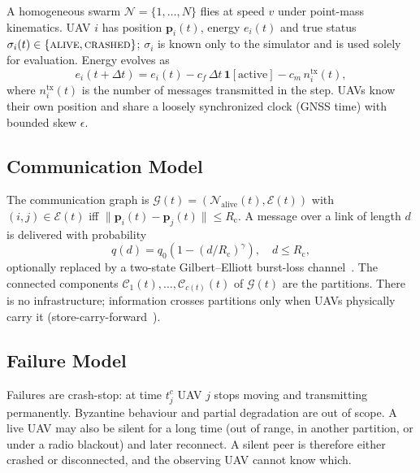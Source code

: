 \documentclass[journal]{IEEEtran}
\newcommand{\Rc}{R_{\mathrm{c}}}
\newcommand{\ind}{\mathbf{1}}
\begin{document}
A homogeneous swarm $\mathcal{N}=\{1,\dots,N\}$ flies at speed $v$ under point-mass kinematics. UAV $i$ has position $\mathbf{p}_i(t)$, energy $e_i(t)$ and true status $\sigma_i(t)\in\{\textsc{alive},\textsc{crashed}\}$; $\sigma_i$ is known only to the simulator and is used solely for evaluation. Energy evolves as
\begin{equation}
e_i(t+\Delta t)=e_i(t)-c_f\,\Delta t\,\ind[\text{active}]-c_m\,n_i^{\mathrm{tx}}(t),
\end{equation}
where $n_i^{\mathrm{tx}}(t)$ is the number of messages transmitted in the step. UAVs know their own position and share a loosely synchronized clock (GNSS time) with bounded skew $\epsilon$.

\subsection{Communication Model}
The communication graph is $\mathcal{G}(t)=(\mathcal{N}_{\mathrm{alive}}(t),\mathcal{E}(t))$ with $(i,j)\in\mathcal{E}(t)$ iff $\|\mathbf{p}_i(t)-\mathbf{p}_j(t)\|\le \Rc$. A message over a link of length $d$ is delivered with probability
\begin{equation}
q(d)=q_0\left(1-(d/\Rc)^{\gamma}\right),\quad d\le \Rc,
\end{equation}
optionally replaced by a two-state Gilbert--Elliott burst-loss channel~\cite{R27_verma2025}. The connected components $\mathcal{C}_1(t),\dots,\mathcal{C}_{c(t)}(t)$ of $\mathcal{G}(t)$ are the partitions. There is no infrastructure; information crosses partitions only when UAVs physically carry it (store-carry-forward~\cite{R13_fall2003}).

\subsection{Failure Model}
Failures are crash-stop: at time $t_j^{c}$ UAV $j$ stops moving and transmitting permanently. Byzantine behaviour and partial degradation are out of scope. A live UAV may also be silent for a long time (out of range, in another partition, or under a radio blackout) and later reconnect. A silent peer is therefore either crashed or disconnected, and the observing UAV cannot know which.
\end{document}
